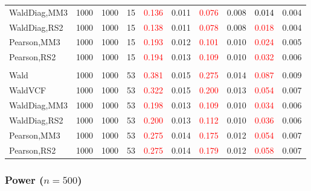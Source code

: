 \documentclass[
]{article}
\begin{document}
\begin{table}[H]
{\begin{tabular}[t]{lrrrrrrlrr}
\hspace{1em}WaldDiag,MM3 & 1000 & 1000 & 15 & \textcolor{red}{0.136} & 0.011 & \textcolor{red}{0.076} & 0.008 & \textcolor{black}{0.014} & 0.004\\
\hspace{1em}WaldDiag,RS2 & 1000 & 1000 & 15 & \textcolor{red}{0.138} & 0.011 & \textcolor{red}{0.078} & 0.008 & \textcolor{red}{0.018} & 0.004\\
\hspace{1em}Pearson,MM3 & 1000 & 1000 & 15 & \textcolor{red}{0.193} & 0.012 & \textcolor{red}{0.101} & 0.010 & \textcolor{red}{0.024} & 0.005\\
\hspace{1em}Pearson,RS2 & 1000 & 1000 & 15 & \textcolor{red}{0.194} & 0.013 & \textcolor{red}{0.109} & 0.010 & \textcolor{red}{0.032} & 0.006\\
\addlinespace[0.3em]
\multicolumn{10}{l}{\textbf{3F 15V}}\\
\hspace{1em}Wald & 1000 & 1000 & 53 & \textcolor{red}{0.381} & 0.015 & \textcolor{red}{0.275} & 0.014 & \textcolor{red}{0.087} & 0.009\\
\hspace{1em}WaldVCF & 1000 & 1000 & 53 & \textcolor{red}{0.322} & 0.015 & \textcolor{red}{0.200} & 0.013 & \textcolor{red}{0.054} & 0.007\\
\hspace{1em}WaldDiag,MM3 & 1000 & 1000 & 53 & \textcolor{red}{0.198} & 0.013 & \textcolor{red}{0.109} & 0.010 & \textcolor{red}{0.034} & 0.006\\
\hspace{1em}WaldDiag,RS2 & 1000 & 1000 & 53 & \textcolor{red}{0.200} & 0.013 & \textcolor{red}{0.112} & 0.010 & \textcolor{red}{0.036} & 0.006\\
\hspace{1em}Pearson,MM3 & 1000 & 1000 & 53 & \textcolor{red}{0.275} & 0.014 & \textcolor{red}{0.175} & 0.012 & \textcolor{red}{0.054} & 0.007\\
\hspace{1em}Pearson,RS2 & 1000 & 1000 & 53 & \textcolor{red}{0.275} & 0.014 & \textcolor{red}{0.179} & 0.012 & \textcolor{red}{0.058} & 0.007\\
\bottomrule
\end{tabular}}
\endgroup{}
\end{table}

\hypertarget{power-n500-1}{%
\subsubsection{\texorpdfstring{Power
(\(n=500\))}{Power (n=500)}}\label{power-n500-1}}
\end{document}
